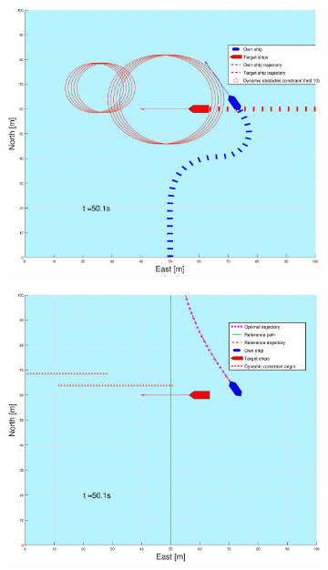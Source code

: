 \begin{figure}[ht]\ContinuedFloat
    \begin{subfigure}[b]{0.49\textwidth}
        \centering
        \includegraphics[width=\textwidth]{Images/Figures/enkel_GW/_Simple_1fig1_time=50}
    \end{subfigure}
    \hfill
    \begin{subfigure}[b]{0.499\textwidth}
        \centering
        \includegraphics[width=\textwidth]{Images/Figures/enkel_GW/_Simple_1fig999_time=50}

\end{subfigure}
\end{figure}

